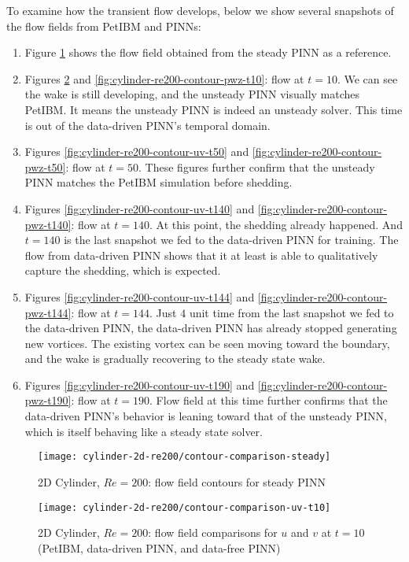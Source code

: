 To examine how the transient flow develops, below we show several snapshots of the flow fields from PetIBM and PINNs:
\begin{enumerate}
    \item Figure \ref{fig:cylinder-re200-contour-steady} shows the flow field obtained from the steady PINN as a reference.
    \item Figures \ref{fig:cylinder-re200-contour-uv-t10} and \ref{fig:cylinder-re200-contour-pwz-t10}: flow at $t=10$. We can see the wake is still developing, and the unsteady PINN visually matches PetIBM. It means the unsteady PINN is indeed an unsteady solver. This time is out of the data-driven PINN's temporal domain.
    \item Figures \ref{fig:cylinder-re200-contour-uv-t50} and \ref{fig:cylinder-re200-contour-pwz-t50}: flow at $t=50$. These figures further confirm that the unsteady PINN matches the PetIBM simulation before shedding.
    \item Figures \ref{fig:cylinder-re200-contour-uv-t140} and \ref{fig:cylinder-re200-contour-pwz-t140}: flow at $t=140$. At this point, the shedding already happened. And $t=140$ is the last snapshot we fed to the data-driven PINN for training. The flow from data-driven PINN shows that it at least is able to qualitatively capture the shedding, which is expected.
    \item Figures \ref{fig:cylinder-re200-contour-uv-t144} and \ref{fig:cylinder-re200-contour-pwz-t144}: flow at $t=144$. Just $4$ unit time from the last snapshot we fed to the data-driven PINN, the data-driven PINN has already stopped generating new vortices. The existing vortex can be seen moving toward the boundary, and the wake is gradually recovering to the steady state wake.
    \item Figures \ref{fig:cylinder-re200-contour-uv-t190} and \ref{fig:cylinder-re200-contour-pwz-t190}: flow at $t=190$. Flow field at this time further confirms that the data-driven PINN's behavior is leaning toward that of the unsteady PINN, which is itself behaving like a steady state solver.
\end{enumerate}

\begin{figure}[hbt!]
    \texttt{[image: cylinder-2d-re200/contour-comparison-steady]}
    \caption{2D Cylinder, $Re=200$: flow field contours for steady PINN}
    \label{fig:cylinder-re200-contour-steady}
\end{figure}

\begin{figure}[hbt!]
    \texttt{[image: cylinder-2d-re200/contour-comparison-uv-t10]}
    \caption{2D Cylinder, $Re=200$: flow field comparisons for $u$ and $v$ at $t=10$ (PetIBM, data-driven PINN, and data-free PINN)}
    \label{fig:cylinder-re200-contour-uv-t10}
\end{figure}

